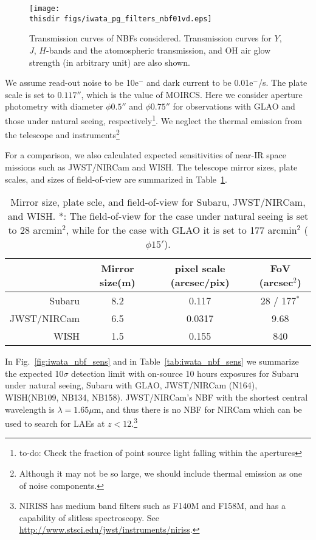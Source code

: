 \begin{figure}[!ht]
\centerline{
\texttt{[image: \\thisdir figs/iwata\_pg\_filters\_nbf01vd.eps]}
}
\caption{
Transmission curves of NBFs considered. Transmission curves for $Y$,
 $J$, $H$-bands and the atomospheric transmission, and OH air glow
 strength (in arbitrary unit) are also shown.
}
\label{fig:iwata_filter_nbf}
\end{figure}

We assume read-out noise to be 10e$^-$ and dark current to be
0.01e$^-$/s. The plate scale is set to $0.117''$, which is the value of
MOIRCS.  Here we consider aperture photometry with diameter $\phi 0.5''$
and  $\phi 0.75''$ for observations with GLAO and those under natural
seeing, respectively\footnote{to-do: Check the fraction of point source
light falling within the apertures}.
We neglect the thermal emission from the telescope and
instruments\footnote{Although it may not be so large, we should include
thermal emission as one of noise components.}

For a comparison, we also calculated expected sensitivities of near-IR
space missions such as JWST/NIRCam and WISH. The telescope mirror sizes, 
plate scales, and sizes of field-of-view are summarized in
Table~\ref{tab:iwata_telescope_param}.

\begin{table}[!ht]
\begin{center}
\begin{tabular}{rccc}
\hline
 & Mirror size(m) & pixel scale (arcsec/pix) & FoV (arcsec$^2$) \\
\hline
Subaru & 8.2 & 0.117 & 28 / 177$^\ast$\\
JWST/NIRCam & 6.5 & 0.0317 & 9.68 \\
WISH & 1.5 & 0.155 & 840\\
\hline
\end{tabular}
\end{center}
\caption{
Mirror size, plate scle, and field-of-view for Subaru, JWST/NIRCam, and
 WISH. 
$\ast$: The field-of-view for the case under natural seeing is set to 28
 arcmin$^2$, while for the case with GLAO it is set to 177 arcmin$^2$
($\phi 15'$).
}
\label{tab:iwata_telescope_param}
\end{table}

In Fig.~\ref{fig:iwata_nbf_sens} and in Table~\ref{tab:iwata_nbf_sens} 
we summarize the expected 10$\sigma$ detection limit with on-source 10
hours exposures for Subaru under natural seeing, Subaru with GLAO,
JWST/NIRCam (N164), WISH(NB109, NB134, NB158).
JWST/NIRCam's NBF with the shortest central wavelength is
$\lambda=1.65\mu$m, and thus there is no NBF for NIRCam which can be
used to search for LAEs at $z<12$.\footnote{NIRISS has medium band
filters such as F140M and F158M, and has a capability of slitless
spectroscopy. See \href{http://www.stsci.edu/jwst/instruments/niriss}{http://www.stsci.edu/jwst/instruments/niriss}.}

